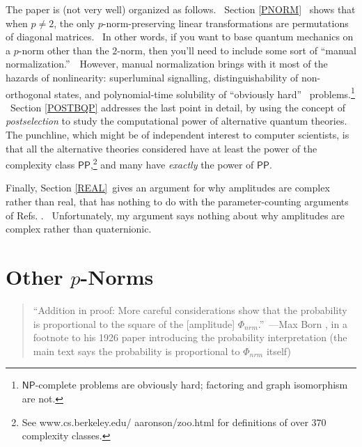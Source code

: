\documentclass[12pt]{article}%
\begin{document}
The paper is (not very well) organized as follows. \ Section \ref{PNORM}%
\ shows that when $p\neq2$, the only $p$-norm-preserving linear
transformations are permutations of diagonal matrices. \ In other words, if
you want to base quantum mechanics on a $p$-norm other than the $2$-norm, then
you'll need to include some sort of \textquotedblleft manual
normalization.\textquotedblright\ \ However, manual normalization brings with
it most of the hazards of nonlinearity: superluminal signalling,
distinguishability of non-orthogonal states, and polynomial-time solubility of
\textquotedblleft obviously hard\textquotedblright
\ problems.\footnote{$\mathsf{NP}$-complete problems are obviously hard;
factoring and graph isomorphism are not.} \ Section \ref{POSTBQP} addresses
the last point in detail, by using the concept of \textit{postselection} to
study the computational power of alternative quantum theories. The
punchline, which might be of independent interest to computer scientists, is
that all the alternative theories considered have at least the power of the
complexity class $\mathsf{PP}$,\footnote{See www.cs.berkeley.edu/%
aaronson/zoo.html for definitions of over $370$ complexity classes.} and many
have \textit{exactly} the power of $\mathsf{PP}$.

Finally, Section \ref{REAL}\ gives an argument for why amplitudes are complex
rather than real, that has nothing to do with the parameter-counting arguments
of Refs. \cite{cfr,cfs,hardy}. \ Unfortunately, my argument says nothing about
why amplitudes are complex rather than quaternionic.

\section{Other $p$-Norms\label{PNORM}}

\begin{quote}
\textquotedblleft Addition in proof: More careful considerations show that the
probability is proportional to the square of the [amplitude] $\Phi_{nrm}%
$.\textquotedblright\ ---Max Born \cite{born}, in a footnote to his 1926 paper
introducing the probability interpretation (the main text says the probability
is proportional to $\Phi_{nrm}$ itself)
\end{quote}
\end{document}

